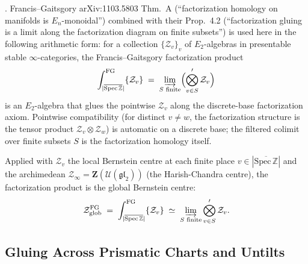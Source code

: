 \begin{theorem}
\label{v4-arith:w6-g:thm:fg-factorization-gluing}
\ClaimStatusConjectured. Francis--Gaitsgory arXiv:1103.5803
Thm.~A (``factorization homology on manifolds is
\(E_{n}\)-monoidal'') combined with their Prop.~4.2 (``factorization
gluing is a limit along the factorization diagram on finite subsets'')
is used here in the following arithmetic form: for a
collection \(\{\mathcal{Z}_{v}\}_{v}\) of \(E_{2}\)-algebras in
presentable stable \(\infty\)-categories, the Francis--Gaitsgory
factorization product
\begin{equation}
\label{v4-arith:w6-g:eq:fg-factorization-product}
\int^{\mathrm{FG}}_{|\overline{\mathrm{Spec}\,\mathbb{Z}}|}\{\mathcal{Z}_{v}\}\;=\;\varinjlim_{S\text{ finite}}\Bigl(\bigotimes'_{v\in S}\mathcal{Z}_{v}\Bigr)
\end{equation}
is an \(E_{2}\)-algebra that glues the pointwise \(\mathcal{Z}_{v}\)
along the discrete-base factorization axiom. Pointwise compatibility
(for distinct \(v\neq w\), the factorization structure is the tensor
product \(\mathcal{Z}_{v}\otimes\mathcal{Z}_{w}\)) is automatic on a
discrete base; the filtered colimit over finite subsets \(S\) is the
factorization homology itself.

Applied with \(\mathcal{Z}_{v}\) the local Bernstein centre at each
finite place \(v\in|\overline{\mathrm{Spec}\,\mathbb{Z}}|\) and the
archimedean \(\mathcal{Z}_{\infty}=\mathbf{Z}(\mathcal{U}(\mathfrak{gl}_{2}))\)
(the Harish-Chandra centre), the factorization product is the
global Bernstein centre:
\begin{equation}
\label{v4-arith:w6-g:eq:fg-global-bernstein}
\mathcal{Z}^{\mathrm{FG}}_{\mathrm{glob}}\;=\;\int^{\mathrm{FG}}_{|\overline{\mathrm{Spec}\,\mathbb{Z}}|}\{\mathcal{Z}_{v}\}\;\simeq\;\varinjlim_{S\text{ finite}}\bigotimes'_{v\in S}\mathcal{Z}_{v}.
\end{equation}
\end{theorem}

\subsection{Gluing Across Prismatic Charts and Untilts}

